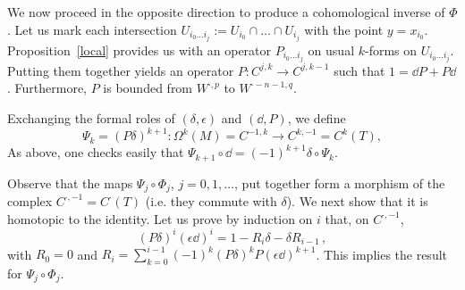 
We now proceed in the opposite direction to produce a cohomological inverse of $\Phi$. Let us mark each intersection $U_{i_0 \dots i_j}:=U_{i_0}\cap\dots\cap U_{i_j}$ with the point $y=x_{i_0}$. Proposition~\ref{local} provides us with an operator $P_{i_0\dots i_j}$ on usual $k$-forms on $U_{i_0 \dots i_j}$. Putting them together yields an operator $P:C^{j,k}\to C^{j,k-1}$ such that $1=\dd P+P\dd$. Furthermore, $P$ is bounded from $W^{\cdot,p}$ to $W^{\cdot-n-1,q}$.

Exchanging the formal roles of $(\delta, \epsilon)$ and $(\dd,P)$, we define
\[
\Psi_k = (P\delta)^{k+1} :\Omega^k(M)=C^{-1,k}\to C^{k,-1}=C^k(T),
\]
As above, one checks easily that $\Psi_{k+1} \circ \dd = (-1)^{k+1}\delta \circ \Psi_k$.

Observe that the maps $\Psi_j \circ \Phi_j$, $j=0,1,\dots$, put together form a morphism of the complex $C^{\cdot,-1}=C^\cdot(T)$ (i.e. they commute with $\delta$). We next show that it is homotopic to the identity. Let us prove by induction on $i$ that, on $C^{\cdot,-1}$,
\begin{equation}\label{eq:7}
(P \delta)^i (\epsilon \dd)^i = 1 - R_i \delta - \delta R_{i-1}\,,
\end{equation}
with $R_0= 0$ and $R_i = \sum_{k=0}^{i-1} (-1)^k (P \delta)^k P (\epsilon \dd)^{k+1}$. This implies the result for $\Psi_j \circ \Phi_j$.
